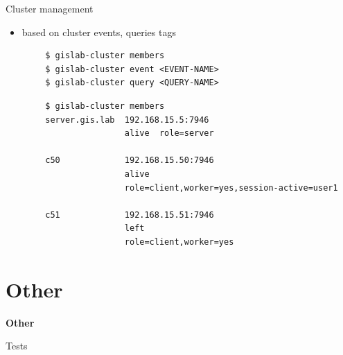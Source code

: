\documentclass[12pt]{beamer}
\begin{document}
\begin{frame}[fragile]{Cluster management}
	\begin{itemize}
		\item based on cluster events, queries tags
	\end{itemize}

	\lstset{language=sh}
	\begin{lstlisting}
		$ gislab-cluster members
		$ gislab-cluster event <EVENT-NAME>
		$ gislab-cluster query <QUERY-NAME>		
	\end{lstlisting}

	\lstset{language=sh}
	\begin{lstlisting}
		$ gislab-cluster members
		server.gis.lab  192.168.15.5:7946 
		                alive  role=server

		c50             192.168.15.50:7946
		                alive
		                role=client,worker=yes,session-active=user1

		c51             192.168.15.51:7946
		                left
		                role=client,worker=yes
	\end{lstlisting}
\end{frame}




\section{Other}
\begin{frame}
	\begin{center}
		\LARGE\textbf{Other}
	\end{center}
\end{frame}

\begin{frame}{Tests}
\end{frame}




\end{document}
